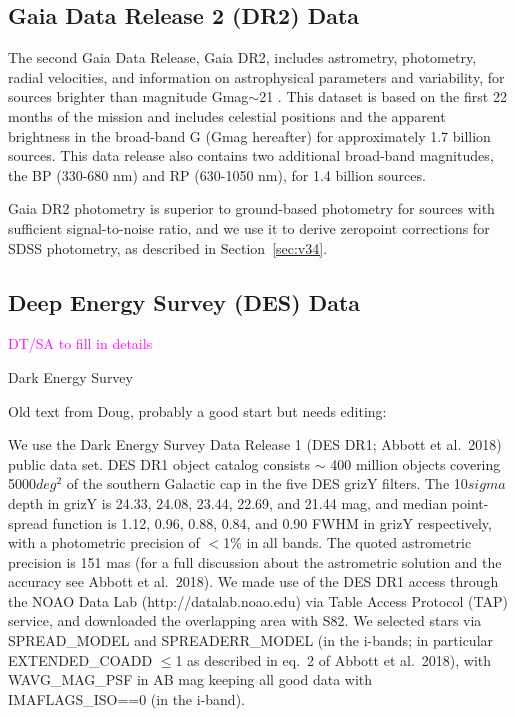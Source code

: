 \documentclass{aastex63}
\newcommand{\tbd}[1]{\textcolor{magenta}{#1}} %
\begin{document}
\subsection{Gaia Data Release 2 (DR2) Data} \label{ssec:gaia}
 
The second Gaia Data Release, Gaia DR2, includes astrometry, photometry, radial velocities, and information on astrophysical parameters and variability, for sources brighter than magnitude Gmag$\sim$21 \citep{2018A&A...616A...1G}. This dataset
is based on the first 22 months of the mission and includes celestial positions and the apparent brightness in the broad-band G (Gmag hereafter) for approximately 1.7 billion sources. This data release also contains two additional broad-band magnitudes, the BP (330-680 nm) and RP (630-1050 nm), for 1.4 billion sources.
    
Gaia DR2 photometry is superior to ground-based photometry for sources with sufficient signal-to-noise ratio, and we use 
it to derive zeropoint corrections for SDSS photometry, as described in Section~\ref{sec:v34}. 


\subsection{Deep Energy Survey (DES) Data} \label{ssec:des}

\tbd{DT/SA to fill in details}
 
Dark Energy Survey \citep{2016MNRAS.460.1270D}

Old text from Doug, probably a good start but needs editing: 

We use the Dark Energy Survey Data Release 1 (DES DR1; Abbott et al.\ 2018) public data set. DES DR1 object catalog consists $\sim$ 400 million objects covering 5000$deg^{2}$ of the southern Galactic cap in the five DES grizY filters. The 10$sigma$ depth in grizY is 24.33, 24.08, 23.44, 22.69, and 21.44 mag, and median point-spread function is 1.12, 0.96, 0.88, 0.84, and 0.90 FWHM in grizY respectively, with a photometric precision of $<$1\% in all bands. The quoted astrometric precision is 151 mas (for a full discussion about the astrometric solution and the accuracy see Abbott et al.\ 2018). We made use of the DES DR1 access through the NOAO Data Lab (http://datalab.noao.edu) via Table Access Protocol (TAP) service, and downloaded the overlapping area with S82. We selected stars via SPREAD\_MODEL and SPREADERR\_MODEL (in the i-bands; in particular EXTENDED\_COADD $\leq$1 as described in eq.~2 of Abbott et al.\ 2018), with WAVG\_MAG\_PSF in AB mag keeping all good data with IMAFLAGS\_ISO==0 (in the i-band).
\end{document}
